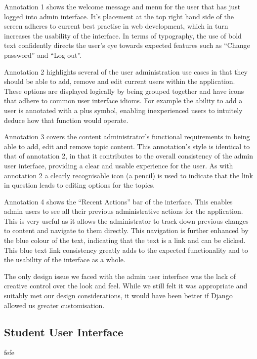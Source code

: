 \documentclass{l3proj}
\begin{document}
Annotation 1 shows the welcome message and menu for the user that has just logged into admin interface. It's placement at the top right hand side of the screen adheres to current best practise in web development, which in turn increases the usability of the interface. In terms of typography, the use of bold text confidently directs the user's eye towards expected features such as ``Change password'' and ``Log out''.

Annotation 2 highlights several of the user administration use cases in that they should be able to add, remove and edit current users within the application. These options are displayed logically by being grouped together and have icons that adhere to common user interface idioms. For example the ability to add a user is annotated with a plus symbol, enabling inexperienced users to intuitely deduce how that function would operate. 

Annotation 3 covers the content administrator's functional requirements in being able to add, edit and remove topic content. This annotation's style is identical to that of annotation 2, in that it contributes to the overall consistency of the admin user interface, providing a clear and usable experience for the user. As with annotation 2 a clearly recognisable icon (a pencil) is used to indicate that the link in question leads to editing options for the topics. 

Annotation 4 shows the ``Recent Actions'' bar of the interface. This enables admin users to see all their previous administrative actions for the application. This is very useful as it allows the administrator to track down previous changes to content and navigate to them directly. This navigation is further enhanced by the blue colour of the text, indicating that the text is a link and can be clicked. This blue text link consistency greatly adds to the expected functionality and to the usability of the interface as a whole.

The only design issue we faced with the admin user interface was the lack of creative control over the look and feel. While we still felt it was appropriate and suitably met our design considerations, it would have been better if Django allowed us greater customisation.

\subsection{Student User Interface}

fefe
\end{document}
